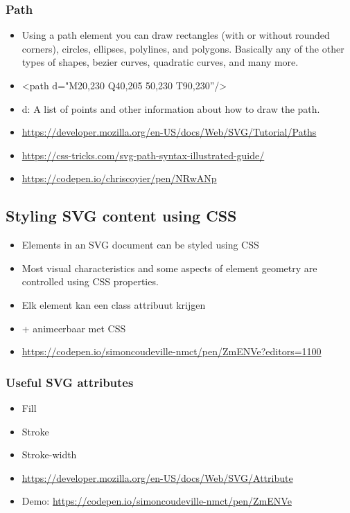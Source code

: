 \documentclass{article}
\begin{document}
\subsubsection{Path}

\begin{itemize}
    \item Using a path element you can draw rectangles (with or without rounded corners), circles, ellipses, polylines, and polygons. Basically any of the other types of shapes, bezier curves, quadratic curves, and many more.
    \item <path d="M20,230 Q40,205 50,230 T90,230”/>
    \item d: A list of points and other information about how to draw the path.
    \item \url{https://developer.mozilla.org/en-US/docs/Web/SVG/Tutorial/Paths}
    \item \url{https://css-tricks.com/svg-path-syntax-illustrated-guide/}
    \item \url{https://codepen.io/chriscoyier/pen/NRwANp}
\end{itemize}

\subsection{Styling SVG content using CSS}
\begin{itemize}
    \item Elements in an SVG document can be styled using CSS
    \item Most visual characteristics and some aspects of element geometry are controlled using CSS properties.
    \item Elk element kan een class attribuut krijgen
    \item + animeerbaar met CSS
    \item \url{https://codepen.io/simoncoudeville-nmct/pen/ZmENVe?editors=1100}
\end{itemize}

\subsubsection{Useful SVG attributes}
\begin{itemize}
    \item Fill
    \item Stroke 
    \item Stroke-width
    \item \url{https://developer.mozilla.org/en-US/docs/Web/SVG/Attribute}
    \item Demo: \url{https://codepen.io/simoncoudeville-nmct/pen/ZmENVe}
\end{itemize}
\end{document}
